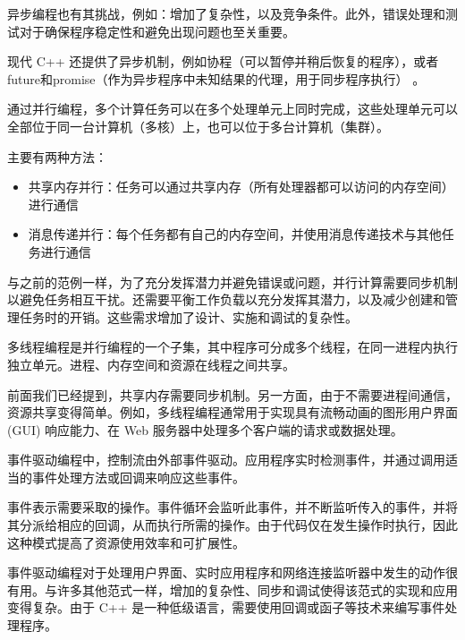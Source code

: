 异步编程也有其挑战，例如：增加了复杂性，以及竞争条件。此外，错误处理和测试对于确保程序稳定性和避免出现问题也至关重要。

现代 C++ 还提供了异步机制，例如协程（可以暂停并稍后恢复的程序），或者future和promise（作为异步程序中未知结果的代理，用于同步程序执行） 。


通过并行编程，多个计算任务可以在多个处理单元上同时完成，这些处理单元可以全部位于同一台计算机（多核）上，也可以位于多台计算机（集群）。

主要有两种方法：

\begin{itemize}
\item
共享内存并行：任务可以通过共享内存（所有处理器都可以访问的内存空间）进行通信

\item
消息传递并行：每个任务都有自己的内存空间，并使用消息传递技术与其他任务进行通信
\end{itemize}

与之前的范例一样，为了充分发挥潜力并避免错误或问题，并行计算需要同步机制以避免任务相互干扰。还需要平衡工作负载以充分发挥其潜力，以及减少创建和管理任务时的开销。这些需求增加了设计、实施和调试的复杂性。


多线程编程是并行编程的一个子集，其中程序可分成多个线程，在同一进程内执行独立单元。进程、内存空间和资源在线程之间共享。

前面我们已经提到，共享内存需要同步机制。另一方面，由于不需要进程间通信，资源共享变得简单。例如，多线程编程通常用于实现具有流畅动画的图形用户界面 (GUI) 响应能力、在 Web 服务器中处理多个客户端的请求或数据处理。


事件驱动编程中，控制流由外部事件驱动。应用程序实时检测事件，并通过调用适当的事件处理方法或回调来响应这些事件。

事件表示需要采取的操作。事件循环会监听此事件，并不断监听传入的事件，并将其分派给相应的回调，从而执行所需的操作。由于代码仅在发生操作时执行，因此这种模式提高了资源使用效率和可扩展性。

事件驱动编程对于处理用户界面、实时应用程序和网络连接监听器中发生的动作很有用。与许多其他范式一样，增加的复杂性、同步和调试使得该范式的实现和应用变得复杂。由于 C++ 是一种低级语言，需要使用回调或函子等技术来编写事件处理程序。


